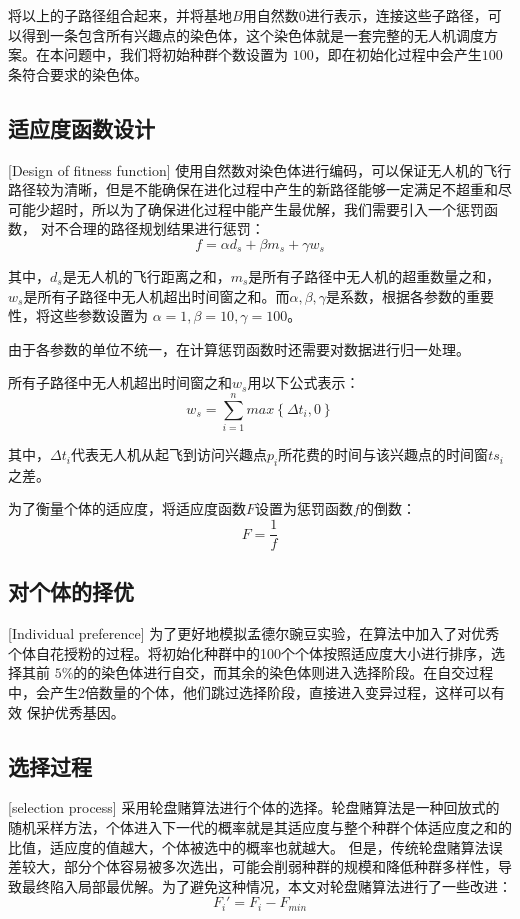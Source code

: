 将以上的子路径组合起来，并将基地$B$用自然数$0$进行表示，连接这些子路径，可以得到一条包含所有兴趣点的染色体，这个染色体就是一套完整的无人机调度方案。在本问题中，我们将初始种群个数设置为
$100$，即在初始化过程中会产生$100$条符合要求的染色体。

\subsection{适应度函数设计}[Design of fitness function]
使用自然数对染色体进行编码，可以保证无人机的飞行路径较为清晰，但是不能确保在进化过程中产生的新路径能够一定满足不超重和尽可能少超时，所以为了确保进化过程中能产生最优解，我们需要引入一个惩罚函数，
对不合理的路径规划结果进行惩罚：
\begin{equation}
	f= \alpha d_s + \beta m_s + \gamma w_s
\end{equation}

其中，$d_s$是无人机的飞行距离之和，$m_s$是所有子路径中无人机的超重数量之和，$w_s$是所有子路径中无人机超出时间窗之和。而$\alpha,\beta,\gamma$是系数，根据各参数的重要性，将这些参数设置为
$\alpha = 1,\beta = 10,\gamma = 100$。


由于各参数的单位不统一，在计算惩罚函数时还需要对数据进行归一处理。


所有子路径中无人机超出时间窗之和$w_s$用以下公式表示：
\begin{equation}
w_s = \sum_{i=1}^n max\left\{\Delta t_i,0\right\}
\end{equation}

其中，$\Delta t_i$代表无人机从起飞到访问兴趣点$p_i$所花费的时间与该兴趣点的时间窗$ts_i$之差。


为了衡量个体的适应度，将适应度函数$F$设置为惩罚函数$f$的倒数：
\begin{equation} 
	F = \frac{1}{f}
\end{equation}

\subsection{对个体的择优}[Individual preference]
为了更好地模拟孟德尔豌豆实验，在算法中加入了对优秀个体自花授粉的过程。将初始化种群中的100个个体按照适应度大小进行排序，选择其前
$5\%$的的染色体进行自交，而其余的染色体则进入选择阶段。在自交过程中，会产生2倍数量的个体，他们跳过选择阶段，直接进入变异过程，这样可以有效
保护优秀基因。

\subsection{选择过程}[selection process]
采用轮盘赌算法进行个体的选择。轮盘赌算法是一种回放式的随机采样方法，个体进入下一代的概率就是其适应度与整个种群个体适应度之和的比值，适应度的值越大，个体被选中的概率也就越大。
但是，传统轮盘赌算法误差较大，部分个体容易被多次选出，可能会削弱种群的规模和降低种群多样性，导致最终陷入局部最优解。为了避免这种情况，本文对轮盘赌算法进行了一些改进：
\begin{equation} 
	F_i' = F_i - F_{min} 
\end{equation}


